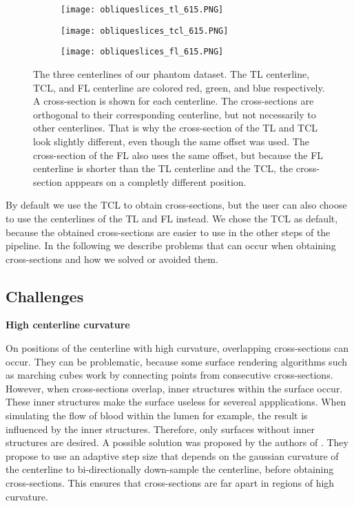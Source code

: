 \documentclass[thesis.tex]{subfiles}
\begin{document}
\begin{figure}
	\begin{subfigure}[t]{0.45\textwidth}
		\texttt{[image: obliqueslices\_tl\_615.PNG]}
	\caption{}		
	\end{subfigure}
\hspace{0.05\textwidth}
	\begin{subfigure}[t]{0.45\textwidth}
		\texttt{[image: obliqueslices\_tcl\_615.PNG]}		
\caption{}	
	\end{subfigure}
\centering
\begin{subfigure}[t]{0.45\textwidth}
		\texttt{[image: obliqueslices\_fl\_615.PNG]}		
\caption{}	
	\end{subfigure}
	\caption{The three centerlines of our phantom dataset. The TL centerline, TCL, and FL centerline are colored red, green, and blue respectively. A cross-section is shown for each centerline. The cross-sections are orthogonal to their corresponding centerline, but not necessarily to other centerlines. That is why the cross-section of the TL and TCL look slightly different, even though the same offset was used. The cross-section of the FL also uses the same offset, but because the FL centerline is shorter than the TL centerline and the TCL, the cross-section apppears on a completly different position.}
\label{fig:obliqueslices}
\end{figure}



By default we use the TCL to obtain cross-sections, but the user can also choose to use the centerlines of the TL and FL instead. We chose the TCL as default, because the obtained cross-sections are easier to use in the other steps of the pipeline.
In the following we describe problems that can occur when obtaining cross-sections and how we solved or avoided them. 

\subsection{Challenges}
\label{problems_crosssections}
\textbf{High centerline curvature} 

On positions of the centerline with high curvature, overlapping cross-sections can occur. They can be problematic, because some surface rendering algorithms such as marching cubes work by connecting points from consecutive cross-sections. However, when cross-sections overlap, inner structures within the surface occur. These inner structures make the surface useless for severeal appplications. When simulating the flow of blood within the lumen for example, the result is influenced by the inner structures. Therefore, only surfaces without inner structures are desired. A possible solution was proposed by the authors of \cite{wu2010curvature}. They propose to use an adaptive step size that depends on the gaussian curvature of the centerline to bi-directionally down-sample the centerline, before obtaining cross-sections. This ensures that cross-sections are far apart in regions of high curvature. 
\end{document}
